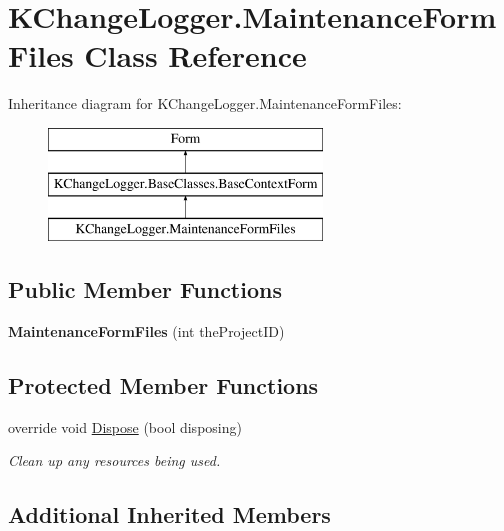 \hypertarget{class_k_change_logger_1_1_maintenance_form_files}{\section{K\-Change\-Logger.\-Maintenance\-Form\-Files Class Reference}
\label{class_k_change_logger_1_1_maintenance_form_files}
}
Inheritance diagram for K\-Change\-Logger.\-Maintenance\-Form\-Files\-:\begin{figure}[H]
\begin{center}
\leavevmode
\includegraphics[height=3.000000cm]{class_k_change_logger_1_1_maintenance_form_files}
\end{center}
\end{figure}
\subsection*{Public Member Functions}
\begin{DoxyCompactItemize}
\item 
\hypertarget{class_k_change_logger_1_1_maintenance_form_files_a30eefd8152421a4fb6169f6dec4b1072}{{\bfseries Maintenance\-Form\-Files} (int the\-Project\-I\-D)}\label{class_k_change_logger_1_1_maintenance_form_files_a30eefd8152421a4fb6169f6dec4b1072}

\end{DoxyCompactItemize}
\subsection*{Protected Member Functions}
\begin{DoxyCompactItemize}
\item 
override void \hyperlink{class_k_change_logger_1_1_maintenance_form_files_aebfad607fa6aff7188052c16769de3ec}{Dispose} (bool disposing)
\begin{DoxyCompactList}\small\item\em Clean up any resources being used. \end{DoxyCompactList}\end{DoxyCompactItemize}
\subsection*{Additional Inherited Members}


